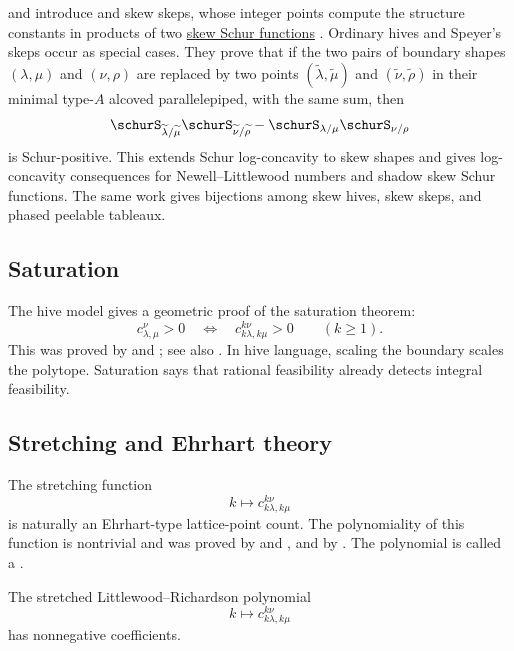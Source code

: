  and  introduce 
\label{skewHiveDefinition} and skew skeps, whose integer points compute the
structure constants in products of two \hyperref[schurSkew]{skew Schur
functions} \cite{LeNguyen2026x}.  Ordinary hives and Speyer's skeps occur as
special cases.  They prove that if the two pairs of boundary shapes
$(\lambda,\mu)$ and $(\nu,\rho)$ are replaced by two points
$(\widetilde\lambda,\widetilde\mu)$ and
$(\widetilde\nu,\widetilde\rho)$ in their minimal type-$A$ alcoved
parallelepiped, with the same sum, then
\[
 \schurS_{\widetilde\lambda/\widetilde\mu}
 \schurS_{\widetilde\nu/\widetilde\rho}
 -\schurS_{\lambda/\mu}\schurS_{\nu/\rho}
\]
is Schur-positive.  This extends Schur log-concavity to skew shapes and gives
log-concavity consequences for Newell--Littlewood numbers and shadow skew
Schur functions.  The same work gives bijections among skew hives, skew skeps,
and phased peelable tableaux.

\subsection[hiveSaturation]{Saturation}

The hive model gives a geometric proof of the saturation theorem:
\[
  c^\nu_{\lambda,\mu}>0
  \quad\Longleftrightarrow\quad
  c^{k\nu}_{k\lambda,k\mu}>0
  \qquad (k\geq 1).
\]
This was proved by  and 
\cite{KnutsonTau1999}; see also \cite{Buch2000}.  In hive language, scaling
the boundary scales the polytope.  Saturation says that rational feasibility
already detects integral feasibility.

\subsection[hiveStretching]{Stretching and Ehrhart theory}

The stretching function
\[
  k\mapsto c^{k\nu}_{k\lambda,k\mu}
\]
is naturally an Ehrhart-type lattice-point count.  The polynomiality of this
function is nontrivial and was proved by  and
 \cite{DerksenWeyman2002}, and by
 \cite{Rassart2004}.  The polynomial is called a
\label{stretchedLRPolynomial}.

\begin{conjecture}
\label{kingTolluToumazetConjecture}
The stretched Littlewood--Richardson polynomial
\[
  k\mapsto c^{k\nu}_{k\lambda,k\mu}
\]
has nonnegative coefficients.
\end{conjecture}

